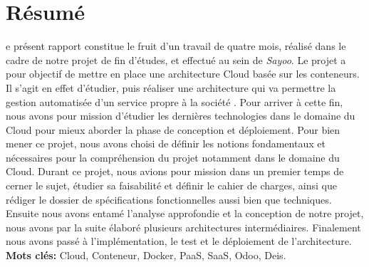 
\chapter*{Résumé}
\begin{onehalfspace}
e présent rapport constitue le fruit d'un travail de quatre mois, réalisé dans le cadre de notre projet de fin d'études, et effectué au sein de \emph{Sayoo}. Le projet a pour objectif de mettre en place une architecture Cloud basée sur les conteneurs.
\newline
\newline
Il s'agit en effet d'étudier, puis réaliser une architecture qui va permettre la gestion automatisée d'un service propre à la société . Pour arriver à cette fin, nous avons pour mission d'étudier les dernières technologies dans le domaine du Cloud pour mieux aborder la phase de conception et déploiement. 
\noindent Pour bien mener ce projet, nous avons choisi de définir les notions fondamentaux et nécessaires pour la compréhension du projet notamment dans le domaine du Cloud.
\newline
\newline
Durant ce projet, nous avions pour mission dans un premier temps de cerner le sujet, étudier sa faisabilité et définir le cahier de charges, ainsi que rédiger le dossier de spécifications fonctionnelles aussi bien que techniques. Ensuite nous avons entamé l'analyse approfondie et la conception de notre projet, nous avons par la suite élaboré plusieurs architectures intermédiaires. Finalement nous avons passé à l'implémentation, le test et le déploiement de l'architecture.
\vfill{\textbf{Mots clés:} Cloud, Conteneur, Docker, PaaS, SaaS, Odoo, Deis.}
\end{onehalfspace}
